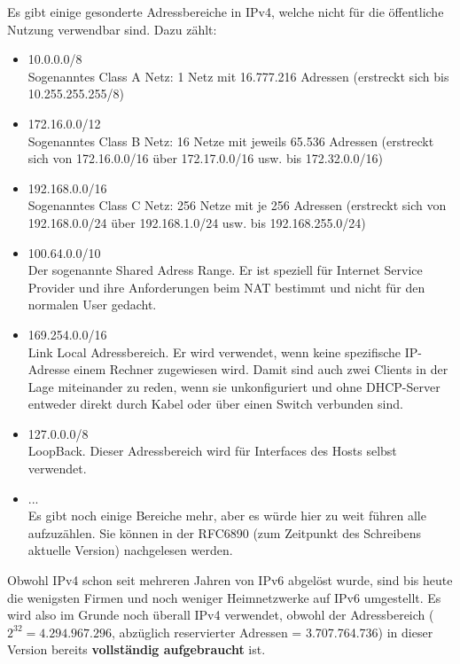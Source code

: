 \documentclass[12pt,a4paper]{report}
\begin{document}
\begin{onehalfspace}
Es gibt einige gesonderte Adressbereiche in IPv4, welche nicht für die öffentliche Nutzung verwendbar sind. Dazu zählt:
\begin{itemize}
\item 10.0.0.0/8\\
Sogenanntes Class A Netz: 1 Netz mit 16.777.216 Adressen (erstreckt sich bis 10.255.255.255/8)
\item 172.16.0.0/12\\
Sogenanntes Class B Netz: 16 Netze mit jeweils 65.536 Adressen (erstreckt sich von 172.16.0.0/16 über 172.17.0.0/16 usw. bis 172.32.0.0/16)
\item 192.168.0.0/16\\
Sogenanntes Class C Netz: 256 Netze mit je 256 Adressen (erstreckt sich von 192.168.0.0/24 über 192.168.1.0/24 usw. bis 192.168.255.0/24)
\item 100.64.0.0/10\\
Der sogenannte Shared Adress Range. Er ist speziell für Internet Service Provider und ihre Anforderungen beim NAT bestimmt und nicht für den normalen User gedacht.
\item 169.254.0.0/16\\
Link Local Adressbereich. Er wird verwendet, wenn keine spezifische IP-Adresse einem Rechner zugewiesen wird. Damit sind auch zwei Clients in der Lage miteinander zu reden, wenn sie unkonfiguriert und ohne DHCP-Server entweder direkt durch Kabel oder über einen Switch verbunden sind.
\item 127.0.0.0/8\\
LoopBack. Dieser Adressbereich wird für Interfaces des Hosts selbst verwendet. 
\item ...\\
Es gibt noch einige Bereiche mehr, aber es würde hier zu weit führen alle aufzuzählen. Sie können in der RFC6890 (zum Zeitpunkt des Schreibens aktuelle Version) nachgelesen werden.
\end{itemize}

Obwohl IPv4 schon seit mehreren Jahren von IPv6 abgelöst wurde, sind bis heute die wenigsten Firmen und noch weniger Heimnetzwerke auf IPv6 umgestellt. Es wird also im Grunde noch überall IPv4 verwendet, obwohl der Adressbereich ($2^{32} = 4.294.967.296$, abzüglich reservierter Adressen = 3.707.764.736) in dieser Version bereits \textbf{vollständig aufgebraucht} ist.\\


\end{onehalfspace}
\end{document}

